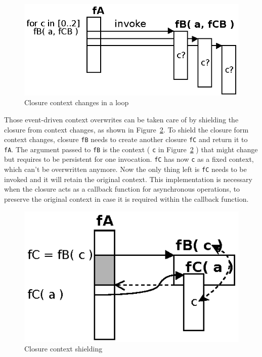 \begin{figure}[!ht]
	\centering
  \includegraphics{figures/Closures_Closure-2}
	\caption{Closure context changes in a loop}
	\label{fig:Closures_Closure-2}
\end{figure}


Those event-driven context overwrites can be taken care of by shielding the closure from context changes, as shown in Figure~\ref{fig:Closures_Closure-3}.
To shield the closure form context changes, closure \texttt{fB} needs to create another closure \texttt{fC} and return it to \texttt{fA}.
The argument passed to \texttt{fB} is the context ( \texttt{c} in Figure~\ref{fig:Closures_Closure-3} ) that might change but requires to be persistent for one invocation.
\texttt{fC} has now \texttt{c} as a fixed context, which can't be overwritten anymore.
Now the only thing left is \texttt{fC} needs to be invoked and it will retain the original context.
This implementation is necessary when the closure acts as a callback function for asynchronous operations, to preserve the original context in case it is required within the callback function.
\begin{figure}[!ht]
	\centering
  \includegraphics{figures/Closures_Closure-3}
	\caption{Closure context shielding}
	\label{fig:Closures_Closure-3}
\end{figure}

